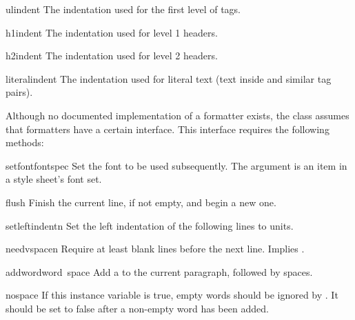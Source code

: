 \begin{datadesc}{ulindent}
The indentation used for the first level of  tags.
\end{datadesc}

\begin{datadesc}{h1indent}
The indentation used for level 1 headers.
\end{datadesc}

\begin{datadesc}{h2indent}
The indentation used for level 2 headers.
\end{datadesc}

\begin{datadesc}{literalindent}
The indentation used for literal text (text inside
 and similar tag pairs).
\end{datadesc}

Although no documented implementation of a formatter exists, the
 class assumes that formatters have a
certain interface.  This interface requires the following methods:

\begin{funcdesc}{setfont}{fontspec}
Set the font to be used subsequently.  The  argument is
an item in a style sheet's font set.
\end{funcdesc}

\begin{funcdesc}{flush}{}
Finish the current line, if not empty, and begin a new one.
\end{funcdesc}

\begin{funcdesc}{setleftindent}{n}
Set the left indentation of the following lines to  units.
\end{funcdesc}

\begin{funcdesc}{needvspace}{n}
Require at least  blank lines before the next line.  Implies
.
\end{funcdesc}

\begin{funcdesc}{addword}{word\, space}
Add a  to the current paragraph, followed by 
spaces.
\end{funcdesc}

\begin{datadesc}{nospace}
If this instance variable is true, empty words should be ignored by
.  It should be set to false after a non-empty word has
been added.
\end{datadesc}

